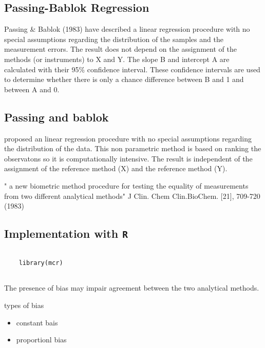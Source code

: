 \documentclass[12pt, a4paper]{report}
\theoremstyle{plain}
\theoremstyle{definition}
\theoremstyle{remark}
\begin{document}
\subsection{Passing-Bablok Regression}


Passing \& Bablok (1983) have described a linear regression procedure with no special assumptions regarding the distribution of the samples and the measurement errors. The result does not depend on the assignment of the methods (or instruments) to X and Y. The slope B and intercept A are calculated with their 95\% confidence interval. These confidence intervals are used to determine whether there is only a chance difference between B and 1 and between A and 0.


\subsection{Passing and bablok}
proposed an linear regression procedure with no special assumptions regarding the distribution of the data.
This non parametric method is based on ranking the observatons so it is computationally intensive.
The result is independent of the assignment of the reference method (X) and the reference method (Y).

" a new biometric method procedure for testing the equality of measurements from two different analytical methods"
J Clin. Chem Clin.BioChem. [21], 709-720 (1983)
\subsection{Implementation with \texttt{R}}

\begin{framed}
	\begin{verbatim}
	
	library(mcr)
	
	\end{verbatim}
\end{framed}
The presence of bias may impair agreement between the two analytical methods.

types of bias

\begin{itemize}
	\item constant bais
	\item proportionl bias
\end{itemize}










\end{document}

